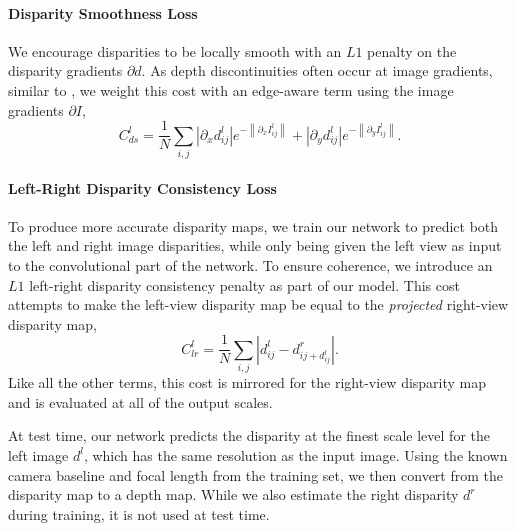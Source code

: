 \documentclass[10pt,twocolumn,letterpaper]{article}
\begin{document}
\paragraph*{Disparity Smoothness Loss}
We encourage disparities to be locally smooth with an $L1$ penalty on the disparity gradients $\partial d$. 
As depth discontinuities often occur at image gradients, similar to \cite{heise2013pm}, we weight this cost with an edge-aware term using the image gradients $\partial I$,
\vspace{-3pt}
\begin{equation}C_{ds}^l = \frac{1}{N} \sum_{i,j} \left | \partial_x d^l_{ij}   \right | e^{-\left \| \partial_x I_{ij}^l \right \|} + \left | \partial_y d^l_{ij}   \right | e^{-\left \| \partial_y I^l_{ij} \right \|}.
\label{eq:cds}
\end{equation}

\paragraph*{Left-Right Disparity Consistency Loss}
To produce more accurate disparity maps, we train our network to predict both the left and right image disparities, while only being given the left view as input to the convolutional part of the network. 
To ensure coherence, we introduce an $L1$ left-right disparity consistency penalty as part of our model. 
This cost attempts to make the left-view disparity map be equal to the \emph{projected} right-view disparity map,
\begin{equation}C_{lr}^l = \frac{1}{N} \sum_{i,j} \left | d^l_{ij} -  d^r_{ij+d^l_{ij}} \right |.
\label{eq:clr}
\end{equation}
Like all the other terms, this cost is mirrored for the right-view disparity map and is evaluated at all of the output scales.

At test time, our network predicts the disparity at the finest scale level for the left image $d^l$, which has the same resolution as the input image. 
Using the known camera baseline and focal length from the training set, we then convert from the disparity map to a depth map.  
While we also estimate the right disparity $d^r$ during training, it is not used at test time. 
\end{document}
